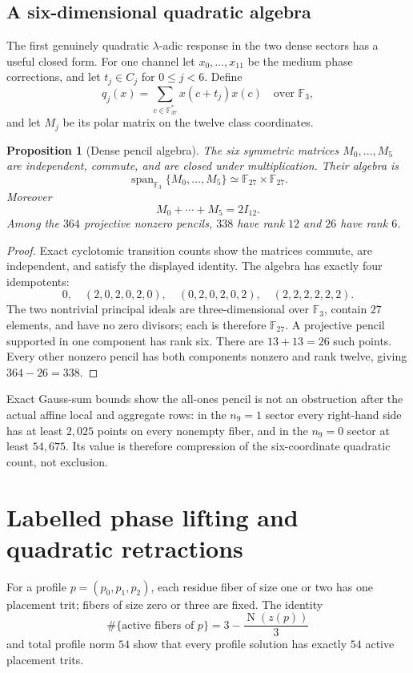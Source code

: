 \documentclass[11pt]{article}
\newtheorem{proposition}[theorem]{Proposition}
\theoremstyle{remark}
\newcommand{\F}{\mathbb F}
\newcommand{\Norm}{\operatorname{N}}
\newcommand{\Span}{\operatorname{span}}
\begin{document}
\subsection{A six-dimensional quadratic algebra}

The first genuinely quadratic $\lambda$-adic response in the two dense
sectors has a useful closed form.  For one channel let
$x_0,\ldots,x_{11}$ be the medium phase corrections, and let $t_j\in C_j$
for $0\leq j<6$.  Define
\[
 q_j(x)=\sum_{c\in\F_{37}^{*}}x(c+t_j)x(c)
 \quad\text{over }\F_3,
\]
and let $M_j$ be its polar matrix on the twelve class coordinates.

\begin{proposition}[Dense pencil algebra]
\label{prop:f27}
The six symmetric matrices $M_0,\ldots,M_5$ are independent, commute, and
are closed under multiplication.  Their algebra is
\[
 \Span_{\F_3}\{M_0,\ldots,M_5\}\simeq\F_{27}\times\F_{27}.
\]
Moreover
\[
 M_0+\cdots+M_5=2I_{12}.
\]
Among the $364$ projective nonzero pencils, $338$ have rank $12$ and $26$
have rank $6$.
\end{proposition}

\begin{proof}
Exact cyclotomic transition counts show the matrices commute, are
independent, and satisfy the displayed identity.  The algebra has exactly
four idempotents:
\[
 0,\quad(2,0,2,0,2,0),\quad(0,2,0,2,0,2),\quad
 (2,2,2,2,2,2).
\]
The two nontrivial principal ideals are three-dimensional over $\F_3$,
contain $27$ elements, and have no zero divisors; each is therefore
$\F_{27}$.  A projective pencil supported in one component has rank six.
There are $13+13=26$ such points.  Every other nonzero pencil has both
components nonzero and rank twelve, giving $364-26=338$.
\end{proof}

Exact Gauss-sum bounds show the all-ones pencil is not an obstruction after
the actual affine local and aggregate rows: in the $n_9=1$ sector every
right-hand side has at least $2{,}025$ points on every nonempty fiber, and
in the $n_9=0$ sector at least $54{,}675$.  Its value is therefore
compression of the six-coordinate quadratic count, not exclusion.

\section{Labelled phase lifting and quadratic retractions}
\label{sec:lifting}

For a profile $p=(p_0,p_1,p_2)$, each residue fiber of size one or two has
one placement trit; fibers of size zero or three are fixed.  The identity
\[
 \#\{\text{active fibers of }p\}=3-\frac{\Norm(z(p))}{3}
\]
and total profile norm $54$ show that every profile solution has exactly
$54$ active placement trits.
\end{document}
